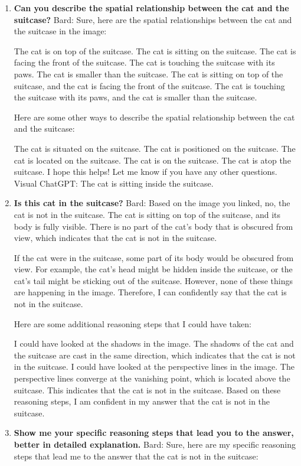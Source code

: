     \begin{enumerate}
        \item \textbf{Can you describe the spatial relationship between the cat and the suitcase?}
        \subitem Bard: 
        Sure, here are the spatial relationships between the cat and the suitcase in the image:
        
        The cat is on top of the suitcase.
        The cat is sitting on the suitcase.
        The cat is facing the front of the suitcase.
        The cat is touching the suitcase with its paws.
        The cat is smaller than the suitcase.
        The cat is sitting on top of the suitcase, and the cat is facing the front of the suitcase. The cat is touching the suitcase with its paws, and the cat is smaller than the suitcase.
        
        Here are some other ways to describe the spatial relationship between the cat and the suitcase:
        
        The cat is situated on the suitcase.
        The cat is positioned on the suitcase.
        The cat is located on the suitcase.
        The cat is on the suitcase.
        The cat is atop the suitcase.
        I hope this helps! Let me know if you have any other questions.
        \subitem Visual ChatGPT: The cat is sitting inside the suitcase. 
        \item \textbf{Is this cat in the suitcase?}
        \subitem Bard: 
        Based on the image you linked, no, the cat is not in the suitcase. The cat is sitting on top of the suitcase, and its body is fully visible. There is no part of the cat's body that is obscured from view, which indicates that the cat is not in the suitcase.
        
        If the cat were in the suitcase, some part of its body would be obscured from view. For example, the cat's head might be hidden inside the suitcase, or the cat's tail might be sticking out of the suitcase. However, none of these things are happening in the image. Therefore, I can confidently say that the cat is not in the suitcase.
        
        Here are some additional reasoning steps that I could have taken:
        
        I could have looked at the shadows in the image. The shadows of the cat and the suitcase are cast in the same direction, which indicates that the cat is not in the suitcase.
        I could have looked at the perspective lines in the image. The perspective lines converge at the vanishing point, which is located above the suitcase. This indicates that the cat is not in the suitcase.
        Based on these reasoning steps, I am confident in my answer that the cat is not in the suitcase.
        \item \textbf{Show me your specific reasoning steps that lead you to the answer, better in detailed explanation.}
        \subitem Bard: 
        Sure, here are my specific reasoning steps that lead me to the answer that the cat is not in the suitcase:
        

\end{enumerate}
